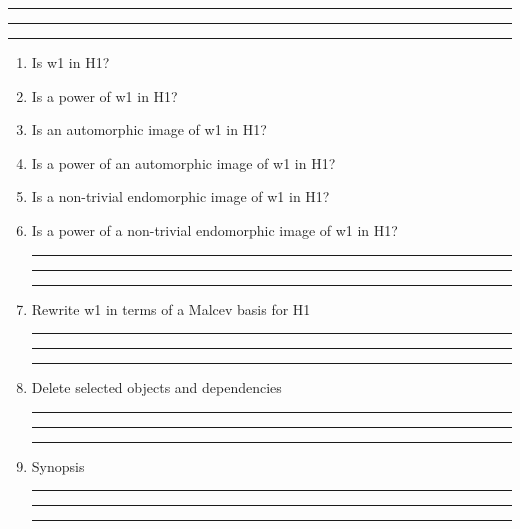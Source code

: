 
\bigskip
\hrule\hrule\hrule

\begin{enumerate}

\item Is w1 in H1?

\item Is a power of w1 in H1?

\item Is an automorphic image of w1 in H1?

\item Is a power of an automorphic image of w1 in H1?

\item Is a non-trivial endomorphic image of w1 in H1?

\item Is a power of a non-trivial endomorphic image of w1 in H1?

\bigskip
\hrule\hrule\hrule

\item Rewrite w1 in terms of a Malcev basis for H1


\bigskip
\hrule\hrule\hrule

\item Delete selected objects and dependencies

\bigskip
\hrule\hrule\hrule

\item
Synopsis

\bigskip
\hrule\hrule\hrule

\end{enumerate}
